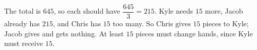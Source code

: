The total is $645$, so each should have $\dfrac{645}{3}=215$. Kyle needs $15$ more, Jacob already has $215$, and Chris has $15$ too many. So $\boxed{\text{Chris gives }15\text{ pieces to Kyle}}$; Jacob gives and gets nothing. At least $15$ pieces must change hands, since Kyle must receive $15$.
